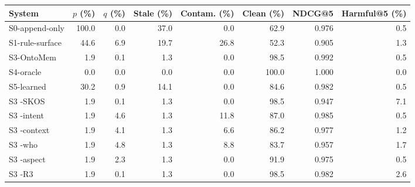 \begin{tabular}{lrrrrrrr}
\toprule
System & $p$ (\%) & $q$ (\%) & Stale (\%) & Contam. (\%) & Clean (\%) & NDCG@5 & Harmful@5 (\%) \\
\midrule
S0-append-only & 100.0 & 0.0 & 37.0 & 0.0 & 62.9 & 0.976 & 0.5 \\
S1-rule-surface & 44.6 & 6.9 & 19.7 & 26.8 & 52.3 & 0.905 & 1.3 \\
S3-OntoMem & 1.9 & 0.1 & 1.3 & 0.0 & 98.5 & 0.992 & 0.5 \\
S4-oracle & 0.0 & 0.0 & 0.0 & 0.0 & 100.0 & 1.000 & 0.0 \\
S5-learned & 30.2 & 0.9 & 14.1 & 0.0 & 84.6 & 0.982 & 0.5 \\
S3 -SKOS & 1.9 & 0.1 & 1.3 & 0.0 & 98.5 & 0.947 & 7.1 \\
S3 -intent & 1.9 & 4.6 & 1.3 & 11.8 & 87.0 & 0.985 & 0.5 \\
S3 -context & 1.9 & 4.1 & 1.3 & 6.6 & 86.2 & 0.977 & 1.2 \\
S3 -who & 1.9 & 4.8 & 1.3 & 8.8 & 83.7 & 0.957 & 1.7 \\
S3 -aspect & 1.9 & 2.3 & 1.3 & 0.0 & 91.9 & 0.975 & 0.5 \\
S3 -R3 & 1.9 & 0.1 & 1.3 & 0.0 & 98.5 & 0.982 & 2.6 \\
\bottomrule
\end{tabular}
